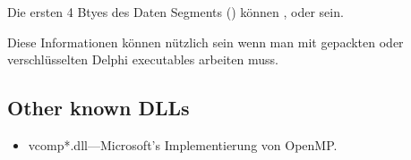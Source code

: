 

Die ersten 4 Btyes des Daten Segments () k\"onnen ,  oder  sein.

Diese Informationen k\"onnen n\"utzlich sein wenn man mit gepackten oder verschl\"usselten Delphi executables arbeiten muss. 

\subsection{Other known DLLs}

\begin{itemize}
\item vcomp*.dll---Microsoft's Implementierung von OpenMP. 
\end{itemize}

